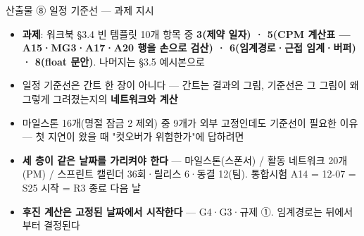 \begin{frame}{산출물 ⑧ 일정 기준선 — 과제 지시}
\begin{itemize}
\item \textbf{과제}: 워크북 §3.4 빈 템플릿 10개 항목 중 \textbf{3(제약 일자) · 5(CPM 계산표 — A15·MG3·A17·A20 행을 손으로 검산) · 6(임계경로·근접 임계·버퍼) · 8(float 문안)}. 나머지는 §3.5 예시본으로
\item 일정 기준선은 간트 한 장이 아니다 — 간트는 결과의 그림, 기준선은 그 그림이 왜 그렇게 그려졌는지의 \textbf{네트워크와 계산}
\item 마일스톤 16개(명절 잠금 2 제외) 중 9개가 외부 고정인데도 기준선이 필요한 이유 — 첫 지연이 왔을 때 "컷오버가 위험한가"에 답하려면
\item \textbf{세 층이 같은 날짜를 가리켜야 한다} — 마일스톤(스폰서) / 활동 네트워크 20개(PM) / 스프린트 캘린더 36회·릴리스 6·동결 12(팀). 통합시험 A14 = 12-07 = S25 시작 = R3 종료 다음 날
\item \textbf{후진 계산은 고정된 날짜에서 시작한다} — G4·G3·규제 ①. 임계경로는 뒤에서부터 결정된다
\end{itemize}
\end{frame}

